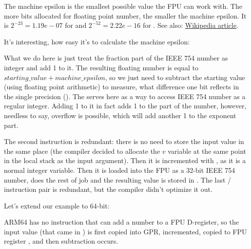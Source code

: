 ﻿

The machine epsilon is the smallest possible value the \ac{FPU} can work with.
The more bits allocated for floating point number, the smaller the machine epsilon.
It is $2^{-23} = 1.19e-07$ for \Tfloat and $2^{-52} = 2.22e-16$ for \Tdouble.
See also: \href{http://link.yurichev.com/17367}{Wikipedia article}.%

It's interesting, how easy it's to calculate the machine epsilon:



What we do here is just treat the fraction part of the IEEE 754 number as integer and add 1 to it.
The resulting floating number is equal to $starting\_value+machine\_epsilon$, so we just need to subtract
the starting value (using floating point arithmetic) to measure, what difference one bit reflects
in the single precision (\Tfloat).
The  serves here as a way to access IEEE 754 number as a regular integer.
Adding 1 to it in fact adds 1 to the  part of the number, however, needless to say,
overflow is possible, which will add another 1 to the exponent part.




The second  instruction is redundant: there is no need to store the input value in the same
place (the compiler decided to allocate the $v$ variable at the same point in the local stack as the input 
argument).
Then it is incremented with , as it is a normal integer variable.
Then it is loaded into the FPU as a 32-bit IEEE 754 number,  does the rest of job and the resulting
value is stored in .
The last / instruction pair is redundant, but the compiler didn't optimize it out.


Let's extend our example to 64-bit:



ARM64 has no instruction that can add a number to a FPU D-register, 
so the input value (that came in ) is first copied into \ac{GPR},
incremented, copied to FPU register , and then subtraction occurs.



